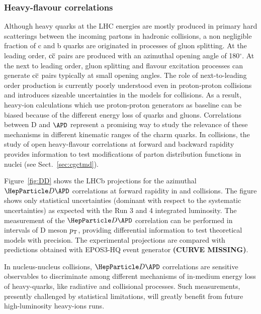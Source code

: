 \subsubsection{Heavy-flavour correlations}
Although heavy quarks at the LHC energies are mostly produced in primary hard scatterings between the incoming partons in hadronic collisions, a non negligible fraction of c and b quarks are originated in processes of gluon splitting. At the leading order, $\rm c\overline c$ pairs are produced with an azimuthal opening angle of 180$^\circ$. At the next to leading order, gluon splitting and flavour excitation processes can generate $\rm c\overline c$ pairs typically at small opening angles. The role of next-to-leading order production is currently poorly understood even in proton-proton collisions \cite{LHCb-PAPER-2012-003,LorentzpaperHF} and introduces sizeable uncertainties in the models for \PbPb collisions. As a result, heavy-ion calculations which use proton-proton generators as baseline can be biased because of the different energy loss of quarks and gluons. Correlations between D and $\APD$ represent a promising way to study the relevance of these mechanisms in different kinematic ranges of the charm quarks. In \pPb collisions, the study of open heavy-flavour correlations at forward and backward rapidity provides information to test modifications of parton distribution functions in nuclei (see Sect.~\ref{sec:cgctmd}). 

Figure~\ref{fig:DD} shows the LHCb projections for the azimuthal ${\PD \APD}$ correlations at forward rapidity in \pp and \pPb collisions. The figure shows only statistical uncertainties (dominant with respect to the systematic uncertainties) as expected with the Run 3 and 4 integrated luminosity. The measurement of the $\PD \APD$ correlation can be performed in intervals of D meson $p\sb{\scriptstyle\mathrm{T}}$, providing differential information to test theoretical models with precision. The experimental projections are compared with predictions obtained with EPOS3-HQ event generator \textbf{(CURVE MISSING)}. 

In nucleus-nucleus collisions, ${\PD \APD}$ correlations are sensitive observables to discriminate among different mechanisms of in-medium energy loss of heavy-quarks, like radiative and collisional processes. Such measurements, presently challenged by statistical limitations, will greatly benefit from future high-luminosity heavy-ions runs. 

